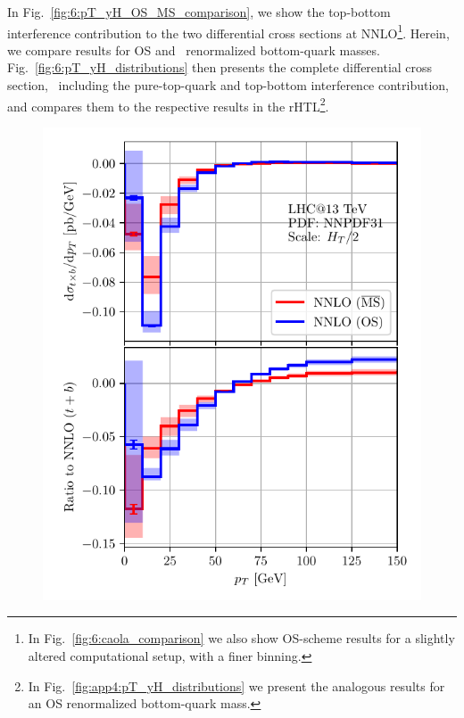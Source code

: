 In Fig.~\ref{fig:6:pT_yH_OS_MS_comparison}, we show the top-bottom interference contribution to the two differential cross sections at \acs{NNLO}\footnote{In Fig.~\ref{fig:6:caola_comparison} we also show \acs{OS}-scheme results for a slightly altered computational setup, with a finer binning.}. Herein, we compare results for \acs{OS} and \MS\ renormalized bottom-quark masses. Fig.~\ref{fig:6:pT_yH_distributions} then presents the complete differential cross section, \ie\ including the pure-top-quark and top-bottom interference contribution, and compares them to the respective results in the \acs{rHTL}\footnote{In Fig.~\ref{fig:app4:pT_yH_distributions} we present the analogous results for an \acs{OS} renormalized bottom-quark mass.}.
\begin{figure}[ht]
\begin{minipage}[t]{0.49\textwidth}
  \includegraphics[width=\textwidth]{Images/pT_MS_OS_comparison_13000.pdf}
\end{minipage}
\begin{minipage}[t]{0.49\textwidth}

\end{minipage}
\end{figure}
